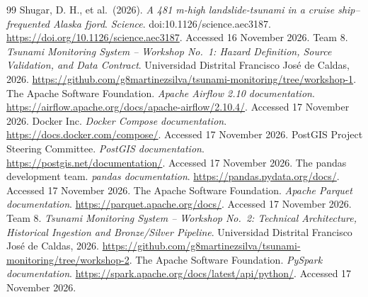\documentclass[a4paper,11pt,oneside]{book}
\begin{document}
\begin{thebibliography}{99}
Shugar, D. H., et al.\ (2026).
\emph{A 481 m-high landslide-tsunami in a
cruise ship--frequented Alaska fjord}.
\textit{Science}. doi:10.1126/science.aec3187.
\url{https://doi.org/10.1126/science.aec3187}.
Accessed 16 November 2026.
 Team 8. \emph{Tsunami Monitoring System -- Workshop No.~1: Hazard Definition, Source Validation, and Data Contract}. Universidad Distrital Francisco Jos\'e de Caldas, 2026. \url{https://github.com/g8martinezsilva/tsunami-monitoring/tree/workshop-1}.
 The Apache Software Foundation. \emph{Apache Airflow 2.10 documentation}. \url{https://airflow.apache.org/docs/apache-airflow/2.10.4/}. Accessed 17 November 2026.
 Docker Inc. \emph{Docker Compose documentation}. \url{https://docs.docker.com/compose/}. Accessed 17 November 2026.
 PostGIS Project Steering Committee. \emph{PostGIS documentation}. \url{https://postgis.net/documentation/}. Accessed 17 November 2026.
 The pandas development team. \emph{pandas documentation}. \url{https://pandas.pydata.org/docs/}. Accessed 17 November 2026.
 The Apache Software Foundation. \emph{Apache Parquet documentation}. \url{https://parquet.apache.org/docs/}. Accessed 17 November 2026.
 Team 8. \emph{Tsunami Monitoring System -- Workshop No.~2: Technical Architecture, Historical Ingestion and Bronze/Silver Pipeline}. Universidad Distrital Francisco Jos\'e de Caldas, 2026. \url{https://github.com/g8martinezsilva/tsunami-monitoring/tree/workshop-2}.
 The Apache Software Foundation. \emph{PySpark documentation}. \url{https://spark.apache.org/docs/latest/api/python/}. Accessed 17 November 2026.


\end{thebibliography}
\end{document}
